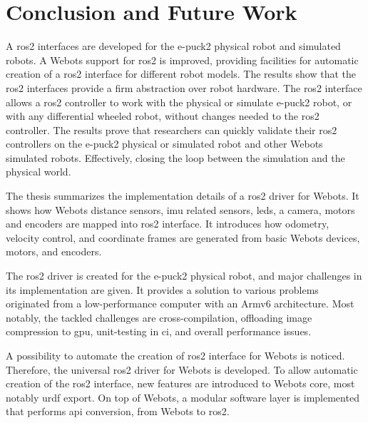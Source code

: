\chapter{Conclusion and Future Work}
\label{chap:conclusion}

A \ac{ros2} interfaces are developed for the e-puck2 physical robot and simulated robots.
A Webots support for \ac{ros2} is improved, providing facilities for automatic creation of a \ac{ros2} interface for different robot models.
The results show that the \ac{ros2} interfaces provide a firm abstraction over robot hardware. 
The \ac{ros2} interface allows a \ac{ros2} controller to work with the physical or simulate e-puck2 robot, or with any differential wheeled robot, without changes needed to the \ac{ros2} controller.
The results prove that researchers can quickly validate their \ac{ros2} controllers on the e-puck2 physical or simulated robot and other Webots simulated robots.
Effectively, closing the loop between the simulation and the physical world.

The thesis summarizes the implementation details of a \ac{ros2} driver for Webots.
It shows how Webots distance sensors, \ac{imu} related sensors, \acp{led}, a camera, motors and encoders are mapped into \ac{ros2} interface.
It introduces how odometry, velocity control, and coordinate frames are generated from basic Webots devices, motors, and encoders.

The \ac{ros2} driver is created for the e-puck2 physical robot, and major challenges in its implementation are given.
It provides a solution to various problems originated from a low-performance computer with an Armv6 architecture. 
Most notably, the tackled challenges are cross-compilation, offloading image compression to \ac{gpu}, unit-testing in \ac{ci}, and overall performance issues.

A possibility to automate the creation of \ac{ros2} interface for Webots is noticed.
Therefore, the universal \ac{ros2} driver for Webots is developed.
To allow automatic creation of the \ac{ros2} interface, new features are introduced to Webots core, most notably \ac{urdf} export.
On top of Webots, a modular software layer is implemented that performs \ac{api} conversion, from Webots to \ac{ros2}.


